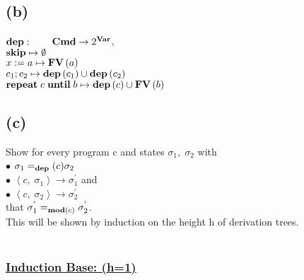 \documentclass[12pt]{scrartcl}
\newcommand{\Mod}[0]{\text{\textbf{mod}}}
\newcommand{\dep}[0]{\text{\textbf{dep}}}
\begin{document}
	\subsection*{(b)}
	
	\indent\indent $\text{\textbf{dep}}: \qquad \text{\textbf{Cmd}}\rightarrow 2^{\text{\textbf{Var}}}$,\\
	\indent $\text{\textbf{skip}}\mapsto\emptyset$\\
	\indent $x:=a\mapsto \text{\textbf{FV}}\left( a\right)$\\
	\indent $c_1;c_2\mapsto \text{\textbf{dep}}\left( c_1\right) \cup\text{\textbf{dep}}\left( c_2\right)$\\
	\indent $\text{\textbf{repeat}}\; c\; \text{\textbf{until}}\; b \mapsto \text{\textbf{dep}}\left( c\right) \cup \text{\textbf{FV}}\left( b\right)$

	\subsection*{(c)}
	
	\indent\indent Show for every program c and states $\sigma_{1} ,\; \sigma_{2}$ with\\
	\indent\indent $\bullet$ \quad $\sigma_{1} =_\dep(c) \sigma_{2}$\\
	\indent\indent $\bullet$ \quad $\left\langle c,\; \sigma_{1} \right\rangle \rightarrow \sigma^{'}_{1}$ and\\
	\indent\indent $\bullet$ \quad $\left\langle c, \; \sigma_{2}\right\rangle \rightarrow \sigma^{'}_{2}$\\
	\indent that $\sigma^{'}_{1} =_{\Mod(c)}\sigma^{'}_{2}$.\\
	\indent This will be shown by induction on the height h of derivation trees.\\\\
	\subsubsection*{\underline{Induction Base: (h=1)}}
	
\end{document}
